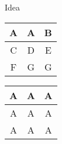 \begin{frame}
\begin{block}{Idea}
\begin{itemize}
{\begin{table}
            \begin{subtable}{0.3\linewidth}
        	\centering
        	\begin{tabular}{|c|c|c|}
                \hline
                A & A & B \\\hline
                C & D & E \\\hline
                F & G & G \\\hline
            \end{tabular}
            \end{subtable}
            \begin{subtable}{0.3\linewidth}
        	\centering
        	\begin{tabular}{|c|c|c|}
                \hline
                A & A & A \\\hline
                A & A & A \\\hline
                A & A & A \\\hline
            \end{tabular}
            \end{subtable}
        	\end{table}
        	}
        \end{itemize}
    \end{block}
\end{frame}

